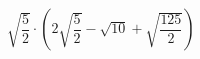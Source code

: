 \begin{ex}[type=expression]
	\begin{condition}
		\( \sqrt{\dfrac{5}{2}}\cdot\left( 2\sqrt{\dfrac{5}{2}}-\sqrt{10}+\sqrt{\dfrac{125}{2}} \right) \)
	\end{condition}
\end{ex}